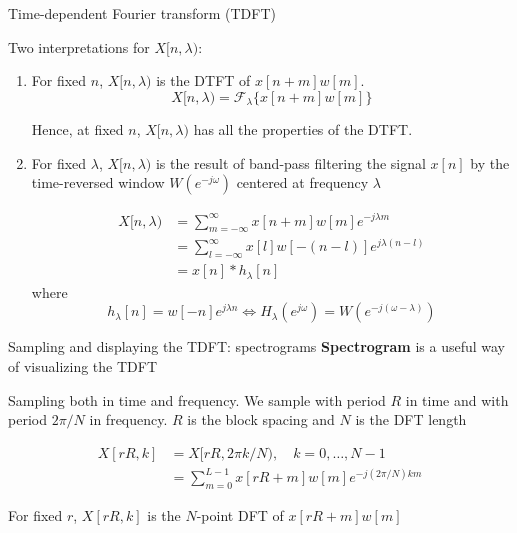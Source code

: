 \documentclass[10pt]{beamer}
\begin{document}
%
\begin{frame}{Time-dependent Fourier transform (TDFT)}

Two interpretations for $X[n, \lambda)$:

\begin{enumerate}
	\item For fixed $n$, $X[n, \lambda)$ is the DTFT of $x[n+m]w[m]$. 
	\begin{equation}
		X[n, \lambda) = \mathcal{F}_\lambda\{x[n+m]w[m]\} \tag{fixed $n$}
	\end{equation}
	
	Hence, at fixed $n$, $X[n, \lambda)$ has all the properties of the DTFT.
	\vspace{0.25cm}
	\item For fixed $\lambda$, $X[n, \lambda)$ is the result of band-pass filtering the signal $x[n]$ by the time-reversed window $W(e^{-j\omega})$ centered at frequency $\lambda$
	
	\begin{align*}
		X[n, \lambda) &= \sum_{m = -\infty}^{\infty}x[n+m]w[m]e^{-j\lambda m} \tag{definition} \\
		&= \sum_{l = -\infty}^{\infty}x[l]w[-(n-l)]e^{j\lambda(n-l)} \tag{change of variables $l = n+m$} \\
		&=x[n]\ast h_\lambda[n] \tag{fixed $\lambda$}
	\end{align*}
	where 
	\begin{equation*}
		h_\lambda[n] = w[-n]e^{j\lambda n} \Longleftrightarrow H_\lambda(e^{j\omega}) = W(e^{-j(\omega-\lambda)}) 
	\end{equation*}
	
\end{enumerate}
\end{frame}

%
\begin{frame}{Sampling and displaying the TDFT: spectrograms}
	\textbf{Spectrogram} is a useful way of visualizing the TDFT
	
	Sampling both in time and frequency.
	We sample with period $R$ in time and with period $2\pi/N$ in frequency. $R$ is the block spacing and $N$ is the DFT length
	
	\begin{align}
		X[rR, k] &= X[rR, 2\pi k/N), \quad k = 0, \ldots, N-1 \tag{sample in time and frequency} \\
		&= \sum_{m = 0}^{L-1}x[rR+m]w[m]e^{-j(2\pi/N)km} \tag{finite-length window}
	\end{align}
			
	For fixed $r$, $X[rR, k]$ is the $N$-point DFT of $x[rR+m]w[m]$
	
\end{frame}
\end{document}
